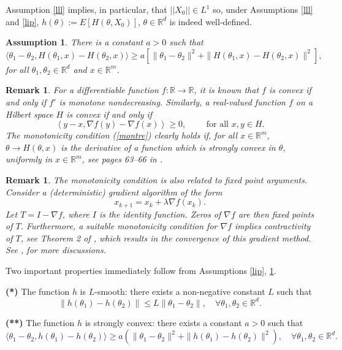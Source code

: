 \documentclass[a4paper]{article}
\newtheorem{remark}[theorem]{Remark}
\newtheorem{assumption}[theorem]{Assumption}
\begin{document}
Assumption \ref{lll} implies, in particular, that $||X_0||\in L^1$ so, under Assumptions \ref{lll} and \ref{lip}, $h(\theta):=E[H(\theta,X_0)]$, $\theta\in\mathbb{R}^d$ is indeed well-defined.

\begin{assumption}\label{diss} There is a constant $a > 0$ such that
	\begin{equation}\label{montre}
	\langle \theta_1-\theta_2,H(\theta_1,x)-H(\theta_2,x)\rangle\geq
	a[\|\theta_1-\theta_2\|^2 + \|H(\theta_1,x)-H(\theta_2,x)\|^2],
	\end{equation}
	for all $\theta_1,\theta_2\in\mathbb{R}^d$ and $x\in\mathbb{R}^m$.
\end{assumption}

\begin{remark}
	{\rm For a differentiable function $f:\mathbb{R} \to \mathbb{R}$, it is known that $f$ is convex if and only if $f'$ is monotone nondecreasing. Similarly, a real-valued function $f$ on a Hilbert space $H$ is convex if and only if
	$$\left\langle  y -x, \nabla f(y) - \nabla f(x) \right\rangle \ge 0, \qquad \text{ for all } x, y \in H.$$
	The monotonicity condition (\ref{montre}) clearly holds if, for all $x \in \mathbb{R}^m$, $\theta\to H(\theta,x)$ is the derivative of a function
which is strongly convex in $\theta$, \emph{uniformly} in $x\in\mathbb{R}^m$,
see pages 63--66 in \cite{nesterov}.}
\end{remark}

\begin{remark}
	{\rm The monotonicity condition is also related to fixed point arguments. Consider a (deterministic) gradient algorithm of the form
	$$x_{k+1} = x_k + \lambda \nabla f(x_k).$$
	Let $T = I - \nabla f$, where $I$ is the identity function. Zeros of $\nabla f$ are then fixed points of $T$. Furthermore, a suitable
monotonicity condition for $\nabla f$ implies contractivity of $T$, see Theorem 2 of \cite{dunn}, which results in the convergence of this gradient method.
See \cite{dunn}, \cite{browder} for more discussions.}
\end{remark}

Two important properties immediately follow from Assumptions \ref{lip}, \ref{diss}.

{\bf (*)} The function $h$ is $L$-smooth: there exists a non-negative constant $L$ such that
\[
\| h(\theta_1)-h(\theta_2)\| \leq L\|\theta_1-\theta_2 \|, \quad \forall \theta_1,\theta_2 \in \mathbb{R}^d.
\]

{\bf (**)} The function $h$ is strongly convex: there exists a constant $a>0$ such that
\[
\langle \theta_1-\theta_2,h(\theta_1)-h(\theta_2)\rangle \geq a \left(\| \theta_1 -\theta_2 \|^2+ \| h(\theta_1) -h(\theta_2) \|^2\right), \quad \forall \theta_1,\theta_2 \in \mathbb{R}^d.
\]
\end{document}
